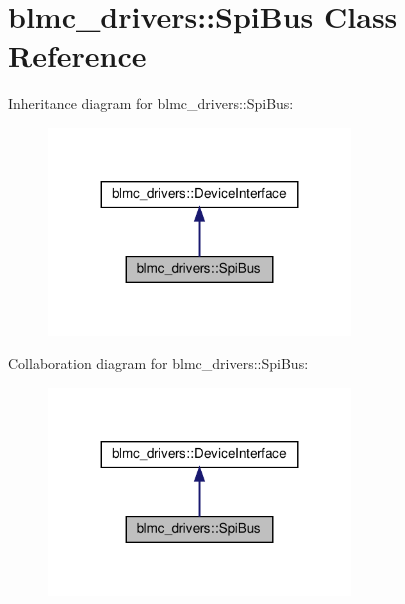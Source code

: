 \hypertarget{classblmc__drivers_1_1SpiBus}{}\section{blmc\+\_\+drivers\+:\+:Spi\+Bus Class Reference}
\label{classblmc__drivers_1_1SpiBus}


Inheritance diagram for blmc\+\_\+drivers\+:\+:Spi\+Bus\+:
\nopagebreak
\begin{figure}[H]
\begin{center}
\leavevmode
\includegraphics[width=227pt]{classblmc__drivers_1_1SpiBus__inherit__graph}
\end{center}
\end{figure}


Collaboration diagram for blmc\+\_\+drivers\+:\+:Spi\+Bus\+:
\nopagebreak
\begin{figure}[H]
\begin{center}
\leavevmode
\includegraphics[width=227pt]{classblmc__drivers_1_1SpiBus__coll__graph}
\end{center}
\end{figure}
